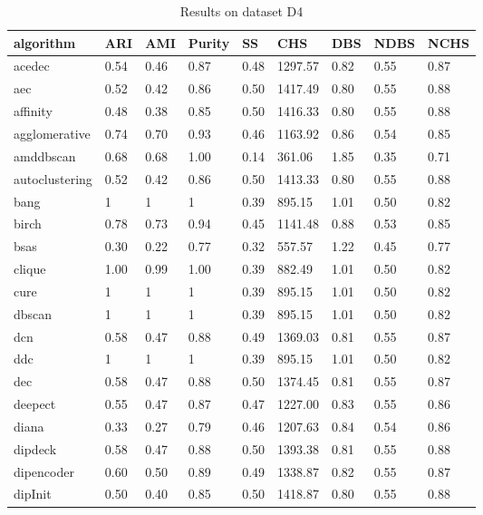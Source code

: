 \begin{table}[H]
\centering
\caption{Results on dataset D4}
\label{tab:params:D4}
\begin{tabular}{|l|l|l|l|l|l|l|l|l|}
\hline
algorithm & ARI & AMI & Purity & SS & CHS & DBS & NDBS & NCHS \\
\hline
acedec & 0.54 & 0.46 & 0.87 & 0.48 & 1297.57 & 0.82 & 0.55 & 0.87 \\
\hline
aec & 0.52 & 0.42 & 0.86 & 0.50 & 1417.49 & 0.80 & 0.55 & 0.88 \\
\hline
affinity & 0.48 & 0.38 & 0.85 & 0.50 & 1416.33 & 0.80 & 0.55 & 0.88 \\
\hline
agglomerative & 0.74 & 0.70 & 0.93 & 0.46 & 1163.92 & 0.86 & 0.54 & 0.85 \\
\hline
amddbscan & 0.68 & 0.68 & 1.00 & 0.14 & 361.06 & 1.85 & 0.35 & 0.71 \\
\hline
autoclustering & 0.52 & 0.42 & 0.86 & 0.50 & 1413.33 & 0.80 & 0.55 & 0.88 \\
\hline
bang & 1 & 1 & 1 & 0.39 & 895.15 & 1.01 & 0.50 & 0.82 \\
\hline
birch & 0.78 & 0.73 & 0.94 & 0.45 & 1141.48 & 0.88 & 0.53 & 0.85 \\
\hline
bsas & 0.30 & 0.22 & 0.77 & 0.32 & 557.57 & 1.22 & 0.45 & 0.77 \\
\hline
clique & 1.00 & 0.99 & 1.00 & 0.39 & 882.49 & 1.01 & 0.50 & 0.82 \\
\hline
cure & 1 & 1 & 1 & 0.39 & 895.15 & 1.01 & 0.50 & 0.82 \\
\hline
dbscan & 1 & 1 & 1 & 0.39 & 895.15 & 1.01 & 0.50 & 0.82 \\
\hline
dcn & 0.58 & 0.47 & 0.88 & 0.49 & 1369.03 & 0.81 & 0.55 & 0.87 \\
\hline
ddc & 1 & 1 & 1 & 0.39 & 895.15 & 1.01 & 0.50 & 0.82 \\
\hline
dec & 0.58 & 0.47 & 0.88 & 0.50 & 1374.45 & 0.81 & 0.55 & 0.87 \\
\hline
deepect & 0.55 & 0.47 & 0.87 & 0.47 & 1227.00 & 0.83 & 0.55 & 0.86 \\
\hline
diana & 0.33 & 0.27 & 0.79 & 0.46 & 1207.63 & 0.84 & 0.54 & 0.86 \\
\hline
dipdeck & 0.58 & 0.47 & 0.88 & 0.50 & 1393.38 & 0.81 & 0.55 & 0.88 \\
\hline
dipencoder & 0.60 & 0.50 & 0.89 & 0.49 & 1338.87 & 0.82 & 0.55 & 0.87 \\
\hline
dipInit & 0.50 & 0.40 & 0.85 & 0.50 & 1418.87 & 0.80 & 0.55 & 0.88 \\
\hline

\end{tabular}
\end{table}
